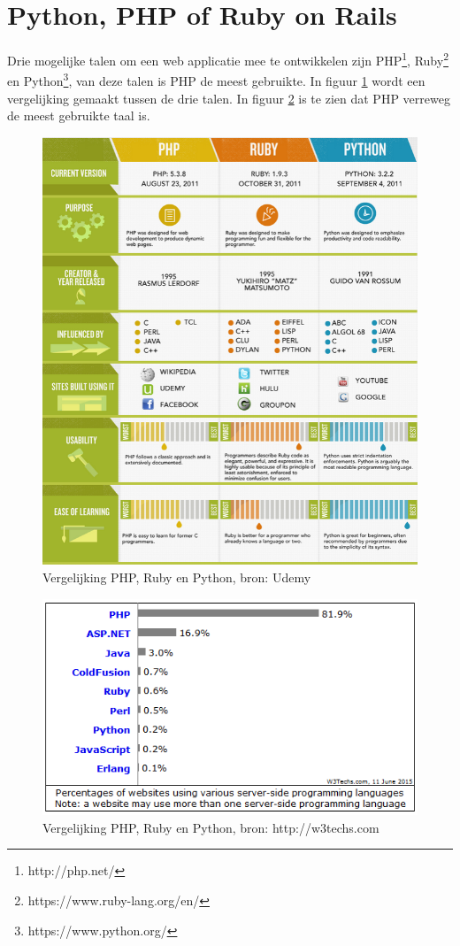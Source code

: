 \documentclass[twoside,openright]{uva-bachelor-thesis}
\begin{document}
		\section{Python, PHP of Ruby on Rails}
			Drie mogelijke talen om een web applicatie mee te ontwikkelen zijn PHP\footnote{http://php.net/}, Ruby\footnote{https://www.ruby-lang.org/en/} en Python\footnote{https://www.python.org/}, van deze talen is PHP de meest gebruikte. In figuur \ref{fig:phpvspython} wordt een vergelijking gemaakt tussen de drie talen. In figuur \ref{fig:phpvspython3} is te zien dat PHP verreweg de meest gebruikte taal is.
			\begin{figure}[!htb]
				\centering
				\includegraphics[scale=0.9]{./img/phpvspython.png}
				\caption{Vergelijking PHP, Ruby en Python, bron: Udemy}
				\label{fig:phpvspython}
			\end{figure} 
			\begin{figure}[!htb]
				\centering
				\includegraphics[scale=0.9]{./img/phpvspython3.png}
				\caption{Vergelijking PHP, Ruby en Python, bron: http://w3techs.com}
				\label{fig:phpvspython3}
			\end{figure} 
\end{document}
